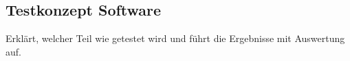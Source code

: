 \subsection{Testkonzept Software}\label{sec:testkonzeptSoftware}

Erklärt, welcher Teil wie getestet wird und führt die Ergebnisse mit Auswertung auf.